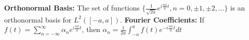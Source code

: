 {\bf Orthonormal Basis:} The set of functions $\{\frac{1}{\sqrt{2a}}e^{i\frac{n\pi}{a} t}, n=0,\pm 1,\pm2,\dots\}$ is an orthonormal basis for $L^2([-a,a])$.
{\bf Fourier Coefficients:} If \newline $f(t)=\sum_{n=-\infty}^{\infty}\alpha_ne^{i\frac{n\pi}{a} t}$, then $\alpha_n=\frac{1}{2a}\int_{-a}^{a}f(t)e^{-i\frac{n\pi}{a} t}dt$